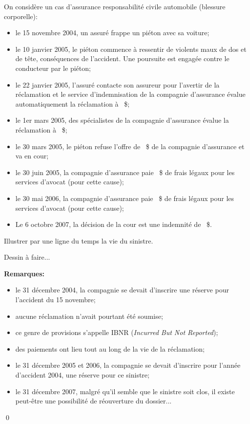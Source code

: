 \begin{exemple}
  On considère un cas d'assurance responsabilité civile automobile
  (blessure corporelle):
  \begin{itemize}
  \item le 15 novembre 2004, un assuré frappe un piéton avec sa
    voiture;
  \item le 10 janvier 2005, le piéton commence à ressentir de violents
    maux de dos et de tête, conséquences de l'accident. Une poursuite
    est engagée contre le conducteur par le piéton;
  \item le 22 janvier 2005, l'assuré contacte son assureur pour
    l'avertir de la réclamation et le service d'indemnisation de la
    compagnie d'assurance évalue automatiquement la réclamation à
    ~\$;
  \item le 1er mars 2005, des spécialistes de la compagnie d'assurance
    évalue la réclamation à ~\$;
  \item le 30 mars 2005, le piéton refuse l'offre de ~\$ de la compagnie d'assurance et va en cour;
  \item le 30 juin 2005, la compagnie d'assurance paie ~\$ de frais légaux pour les services d'avocat (pour cette
    cause);
  \item le 30 mai 2006, la compagnie d'assurance paie ~\$ de frais légaux pour les services d'avocat (pour cette
    cause);
  \item Le 6 octobre 2007, la décision de la cour est une indemnité de
    ~\$.
  \end{itemize}
  Illustrer par une ligne du temps la vie du sinistre.

  Dessin à faire...

  \textbf{Remarques: }
  \begin{itemize}
  \item le 31 décembre 2004, la compagnie se devait d'inscrire une
    réserve pour l'accident du 15 novembre;
  \item aucune réclamation n'avait pourtant été soumise;
  \item ce genre de provisions s'appelle IBNR (\emph{Incurred But Not
      Reported});
  \item des paiements ont lieu tout au long de la vie de la
    réclamation;
  \item le 31 décembre 2005 et 2006, la compagnie se devait d'inscrire
    pour l'année d'accident 2004, une réserve pour ce sinistre;
  \item le 31 décembre 2007, malgré qu'il semble que le sinistre soit
    clos, il existe peut-être une possibilité de réouverture du
    dossier...
  \end{itemize}
  \qed
\end{exemple}

